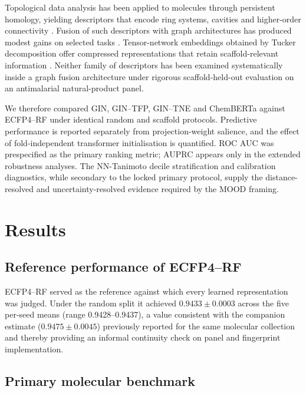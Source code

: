 \documentclass[11pt,a4paper]{article}
\begin{document}
Topological data analysis has been applied to molecules through persistent homology, yielding descriptors that encode ring systems, cavities and higher-order connectivity \citep{tda_review_2025}. Fusion of such descriptors with graph architectures has produced modest gains on selected tasks \citep{topology_molecular_representations_2025}. Tensor-network embeddings obtained by Tucker decomposition offer compressed representations that retain scaffold-relevant information \citep{tn_efficient_2026}. Neither family of descriptors has been examined systematically inside a graph fusion architecture under rigorous scaffold-held-out evaluation on an antimalarial natural-product panel.

We therefore compared GIN, GIN--TFP, GIN--TNE and ChemBERTa against ECFP4--RF under identical random and scaffold protocols. Predictive performance is reported separately from projection-weight salience, and the effect of fold-independent transformer initialisation is quantified. ROC AUC was prespecified as the primary ranking metric; AUPRC appears only in the extended robustness analyses. The NN-Tanimoto decile stratification and calibration diagnostics, while secondary to the locked primary protocol, supply the distance-resolved and uncertainty-resolved evidence required by the MOOD framing.

\section{Results}

\subsection{Reference performance of ECFP4--RF}

ECFP4--RF served as the reference against which every learned representation was judged. Under the random split it achieved $\num{0.9433} \pm \num{0.0003}$ across the five per-seed means (range \num{0.9428}--\num{0.9437}), a value consistent with the companion estimate ($\num{0.9475} \pm \num{0.0045}$) previously reported for the same molecular collection \citep{temgoua2027quantum} and thereby providing an informal continuity check on panel and fingerprint implementation.

\subsection{Primary molecular benchmark}
\end{document}
